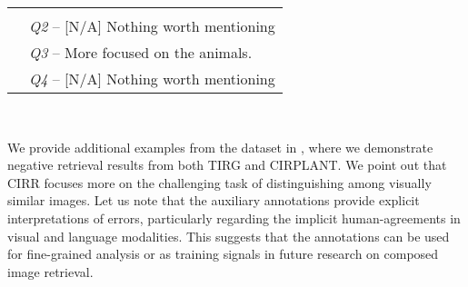\documentclass[10pt,twocolumn,letterpaper]{article}
\newcommand{\dstname}{CIRR\xspace}
\newcommand{\modelname}{CIRPLANT\xspace}
\begin{document}
\begin{figure*}[!ht]
\begin{minipage}{0.98\linewidth}
\begin{tabular}{lccccc}
{      }\\
      &\multicolumn{5}{l}{
        \textit{Q2} -- [N/A] Nothing worth mentioning
      }\\
      &\multicolumn{5}{l}{
        \textit{Q3} -- More focused on the animals.
      }\\
      &\multicolumn{5}{l}{
        \textit{Q4} -- [N/A] Nothing worth mentioning
      }\\[0.05ex]
\end{tabular}
    \end{minipage}\\[2pt]
\caption{Negative results of TIRG and \modelname on \dstname. Here, we show the Recall$_{\text{Subset}}$ rankings where we consider candidates from corresponding image subsets (see ). First column shows the reference images. True targets are in green boxes. Each pair contains a main annotation (Main) and four auxiliary annotations (Q1--4) as explained in  and .  We demonstrate errors of the models where: (a) fails to associate text with both reference and target image; and (b--d) fails to identify and preserve implicit global visual similarity. We show that \dstname focuses on the challenging task of distinguishing harder negatives that require fine-grained visual reasoning. Let us note that the errors can be explicitly interpreted with our auxiliary annotations (bolded), which previous datasets cannot. This suggests that future work can leverage the auxiliary annotations for analysis of methods, and possibly training of models that account for implicit human ambiguities.}
  \label{fig:cirr_examples}
\end{figure*}
 We provide additional examples from the dataset in , where we demonstrate negative retrieval results from both TIRG and \modelname. 
We point out that \dstname focuses more on the challenging task of distinguishing among visually similar images.
Let us note that the auxiliary annotations provide explicit interpretations of errors, particularly regarding the implicit human-agreements in visual and language modalities. This suggests that the annotations can be used for fine-grained analysis or as training signals in future research on composed image retrieval.
\end{document}
